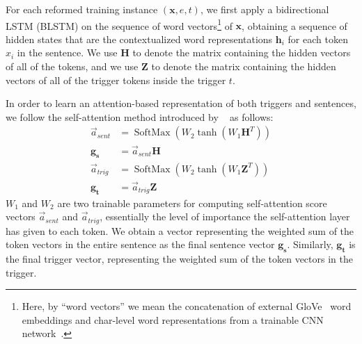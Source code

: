 For each reformed training instance $(\mathbf{x}, e, t)$, we first apply a bidirectional LSTM (BLSTM) 
on the sequence of word vectors\footnote{Here, by ``word vectors'' we mean the concatenation of external GloVe~\cite{Pennington2014GloveGV} word embeddings and char-level word representations from a trainable CNN network~\cite{DBLP:conf/acl/MaH16}. } 
of $\mathbf{x}$, obtaining a sequence of hidden states that are the contextualized word representations $\mathbf{h}_i$ for each token $x_i$ in the sentence. 
We use $\mathbf{H}$ to denote the matrix containing the hidden vectors of all of the tokens, and we use $\mathbf{Z}$ to denote the matrix containing the hidden vectors of all of the trigger tokens inside the trigger $t$.

In order to learn an attention-based
representation of both triggers and sentences, we follow the self-attention method introduced by ~\cite{selfattentive} as follows:
{
{ %
		\begin{align*} 
			\vec{a}_{sent}&=\operatorname{SoftMax}\left(W_{2} \tanh \left(W_{1} \mathbf{H}^{T}\right)\right)\\
			\mathbf{g_s}&=\vec{a}_{sent}\mathbf{H}\\
			\vec{a}_{trig}&=\operatorname{SoftMax}\left(W_{2} \tanh \left(W_{1} \mathbf{Z}^{T}\right)\right)\\
			\mathbf{g_t}&=\vec{a}_{trig}\mathbf{Z}
		\end{align*} 
	}
}  
$W_1$ and $W_2$ are two trainable parameters for computing self-attention score vectors $\vec{a}_{sent}$ and $\vec{a}_{trig}$, essentially the level of importance the self-attention layer has given to each token.
We obtain a vector representing the weighted sum of the token vectors in the entire sentence as the final sentence vector $\mathbf{g_s}$. Similarly, $\mathbf{g_t}$ is the final trigger vector, representing the weighted sum of the token vectors in the trigger.

